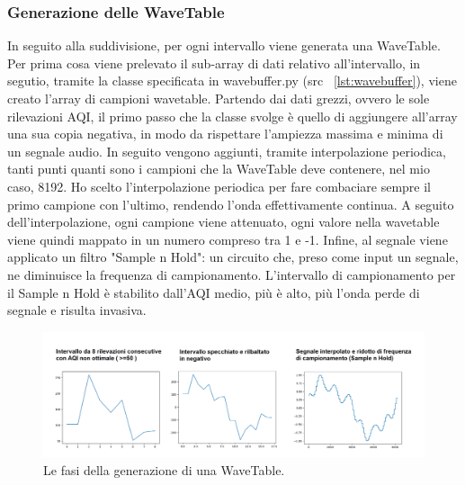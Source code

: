 \subsubsection{Generazione delle WaveTable}
In seguito alla suddivisione, per ogni intervallo viene generata una WaveTable.
Per prima cosa viene prelevato il sub-array di dati relativo all'intervallo, in segutio, tramite la classe specificata in wavebuffer.py (src ~\ref{lst:wavebuffer}), viene creato l'array di campioni wavetable.
Partendo dai dati grezzi, ovvero le sole rilevazioni AQI, il primo passo che la classe svolge è quello di aggiungere all'array una sua copia negativa, in modo da rispettare l'ampiezza massima e minima di un segnale audio.
In seguito vengono aggiunti, tramite interpolazione periodica, tanti punti quanti sono i campioni che la WaveTable deve contenere, nel mio caso, 8192.
Ho scelto l'interpolazione periodica per fare combaciare sempre il primo campione con l'ultimo, rendendo l'onda effettivamente continua.
A seguito dell'interpolazione, ogni campione viene attenuato, ogni valore nella wavetable viene quindi mappato in un numero compreso tra 1 e -1.
Infine, al segnale viene applicato un filtro "Sample n Hold": un circuito che, preso come input un segnale, ne diminuisce la frequenza di campionamento.
L'intervallo di campionamento per il Sample n Hold è stabilito dall'AQI medio, più è alto, più l'onda perde di segnale e risulta invasiva.
\\
\begin{figure}[h]
  \includegraphics[width=\linewidth]{img/waves.png}
  \caption{Le fasi della generazione di una WaveTable.}
  \label{fig:wave_sub}
\end{figure}

\newpage

